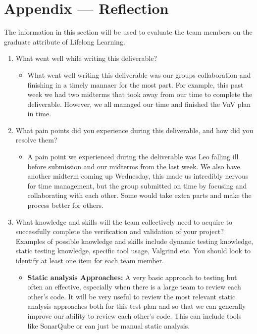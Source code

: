 \documentclass[12pt, titlepage]{article}
\begin{document}
\newpage{}
\section*{Appendix --- Reflection}

The information in this section will be used to evaluate the team members on the
graduate attribute of Lifelong Learning.



\begin{enumerate}
  \item What went well while writing this deliverable? 
  \begin{itemize}
        \item What went well writing this deliverable was our groups collaboration and finishing in a timely mannaer for the most part.
        For example, this past week we had two midterms that took away from our time to complete the deliverable. However, we all managed our time
        and finished the VnV plan in time.
  \end{itemize}
  \item What pain points did you experience during this deliverable, and how
    did you resolve them?
  \begin{itemize}
        \item A pain point we experienced during the deliverable was Leo falling ill before submission and our midterms from the last week. We also have another midterm coming up Wednesday, this 
         made us intredibly nervous for time management, but the group submitted on time 
         by focusing and collaborating with each other. Some would take extra parts and make the process better for others.
  \end{itemize}
  \item What knowledge and skills will the team collectively need to acquire to
  successfully complete the verification and validation of your project?
  Examples of possible knowledge and skills include dynamic testing knowledge,
  static testing knowledge, specific tool usage, Valgrind etc.  You should look to
  identify at least one item for each team member.

  \begin{itemize}

    \item \textbf{Static analysis Approaches: }A very basic approach to testing but often an effective, especially when there is a large team to review each other's code. It will be very useful to review the most relevant static analysis approaches both for this test plan and so that we can generally improve our ability to review each other's code. This can include tools like SonarQube or can just be manual static analysis.


\end{itemize}
\end{enumerate}
\end{document}
